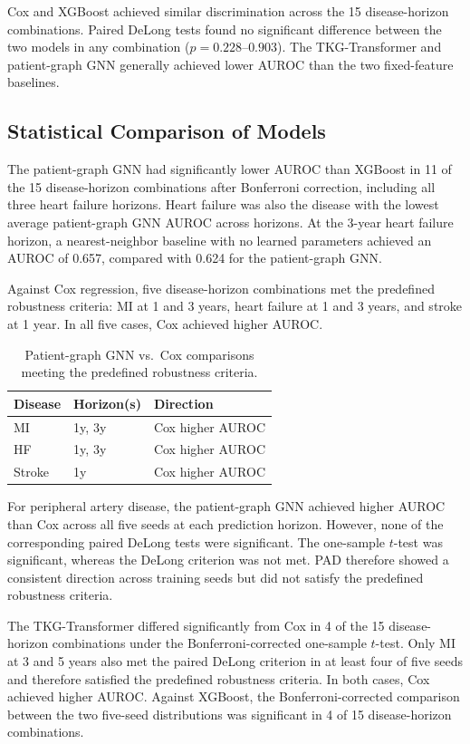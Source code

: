 Cox and XGBoost achieved similar discrimination across the 15 disease-horizon combinations. Paired DeLong tests found no significant difference between the two models in any combination ($p=0.228$--$0.903$). The TKG-Transformer and patient-graph GNN generally achieved lower AUROC than the two fixed-feature baselines.

\subsection{Statistical Comparison of Models}
\label{sec:results-comparisons}

The patient-graph GNN had significantly lower AUROC than XGBoost in 11 of the 15 disease-horizon combinations after Bonferroni correction, including all three heart failure horizons. Heart failure was also the disease with the lowest average patient-graph GNN AUROC across horizons. At the 3-year heart failure horizon, a nearest-neighbor baseline with no learned parameters achieved an AUROC of 0.657, compared with 0.624 for the patient-graph GNN.

Against Cox regression, five disease-horizon combinations met the predefined robustness criteria: MI at 1 and 3 years, heart failure at 1 and 3 years, and stroke at 1 year. In all five cases, Cox achieved higher AUROC.

\begin{table}[t]
\centering
\small
\caption{Patient-graph GNN vs.\ Cox comparisons meeting the predefined robustness criteria.}
\label{tab:robust-cox}
\begin{tabular}{lll}
\hline
Disease & Horizon(s) & Direction \\
\hline
MI     & 1y, 3y & Cox higher AUROC \\
HF     & 1y, 3y & Cox higher AUROC \\
Stroke & 1y     & Cox higher AUROC \\
\hline
\end{tabular}
\end{table}

For peripheral artery disease, the patient-graph GNN achieved higher AUROC than Cox across all five seeds at each prediction horizon. However, none of the corresponding paired DeLong tests were significant. The one-sample $t$-test was significant, whereas the DeLong criterion was not met. PAD therefore showed a consistent direction across training seeds but did not satisfy the predefined robustness criteria.

The TKG-Transformer differed significantly from Cox in 4 of the 15 disease-horizon combinations under the Bonferroni-corrected one-sample $t$-test. Only MI at 3 and 5 years also met the paired DeLong criterion in at least four of five seeds and therefore satisfied the predefined robustness criteria. In both cases, Cox achieved higher AUROC. Against XGBoost, the Bonferroni-corrected comparison between the two five-seed distributions was significant in 4 of 15 disease-horizon combinations.


